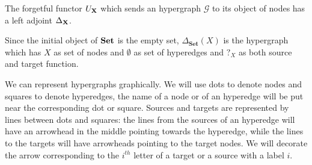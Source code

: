 \documentclass[runningheads,envcountsect]{lipics-v2021}
\newcommand{\Set}{\mathbf{Set}}
\def\X{\textbf {\textup{X}}}
\newcommand{\catname}[1]{\textbf{\textup{#1}}}
\begin{document}
\begin{proposition}\label{cor:left}  The forgetful functor $U_{\X}$ which sends an hypergraph $\mathcal{G}$ to its object of nodes has a left adjoint $\Delta_{\X}$.
\end{proposition}

\begin{example}Since the initial object of $\catname{Set}$ is the empty set,  $\Delta_{\Set}(X)$ is the hypergraph which has $X$ as set of nodes and $\emptyset$ as set of hyperedges and $?_X$ as both source and target function.
\end{example}


We can represent hypergraphs graphically. We will use dots to denote nodes and squares to denote hyperedges, the name of a node or of an hyperedge will be put near the corresponding dot or square. Sources and targets are represented by lines between dots and squares: the lines from the sources of an hyperedge will have an arrowhead in the middle pointing towards the hyperedge, while the lines to the targets will have arrowheads pointing to the target nodes.  We will decorate the arrow corresponding to the $i^{th}$ letter of a target or a source with a label $i$.
\end{document}
